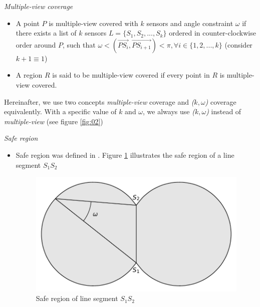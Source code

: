 
\begin{df} 
{\itshape Multiple-view coverage}
\begin{itemize}
	\item A point $P$ is multiple-view covered with $k$ sensors and angle constraint $\omega$ if there exists a list of $k$ sensors $L = \{S_1, S_2,...,S_k\}$ ordered in counter-clockwise order around $P$, such that $\omega < (\overrightarrow{PS_i}, \overrightarrow{PS_{i+1}}) < \pi, \forall i \in \{1,2,...,k\}$ (consider $k + 1 \equiv 1$)
	\item A region $R$ is said to be multiple-view covered if every point in $R$ is multiple-view covered.
\end{itemize}
Hereinafter, we use two concepts {\itshape multiple-view} coverage and {\itshape ($k,\omega$)} coverage equivalently. With a specific value of $k$ and $\omega$, we always use {\itshape ($k,\omega$)} instead of {\itshape multiple-view} (see figure \ref{fig:02})
\end{df}
\begin{df}
{\itshape Safe region}
\begin{itemize}
	\item Safe region was defined in \cite{tseng2012k}. Figure \ref{saferegion} illustrates the safe region of a line segment $S_1S_2$
	\begin{figure}[!h]
		\centering
		\includegraphics[scale=.5]{Hinhanh/safe-region}
		\caption{Safe region of line segment $S_1S_2$}
		\label{saferegion}
	\end{figure}
\end{itemize}
\end{df}

